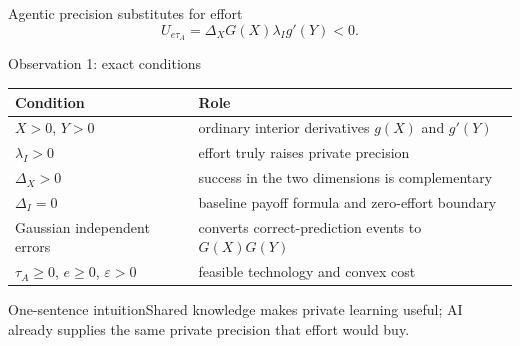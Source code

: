 \documentclass[aspectratio=169,10pt]{beamer}
\begin{document}
\begin{frame}{Agentic precision substitutes for effort}
\small
\[
\boxed{U_{e\tau_A}=\Delta_XG(X)\lambda_Ig'(Y)<0.}
\]
\begin{center}
\end{center}
\end{frame}

\begin{frame}{Observation 1: exact conditions}
\small
\begin{tabular}{@{}p{3.2cm}p{9.5cm}@{}}\toprule
Condition & Role\\\midrule
$X>0$, $Y>0$ & ordinary interior derivatives $g(X)$ and $g'(Y)$\\
$\lambda_I>0$ & effort truly raises private precision\\
$\Delta_X>0$ & success in the two dimensions is complementary\\
$\Delta_I=0$ & baseline payoff formula and zero-effort boundary\\
Gaussian independent errors & converts correct-prediction events to $G(X)G(Y)$\\
$\tau_A\ge0$, $e\ge0$, $\varepsilon>0$ & feasible technology and convex cost\\\bottomrule
\end{tabular}
\vspace{.35cm}\begin{alertblock}{One-sentence intuition}Shared knowledge makes private learning useful; AI already supplies the same private precision that effort would buy.\end{alertblock}
\end{frame}
\end{document}
